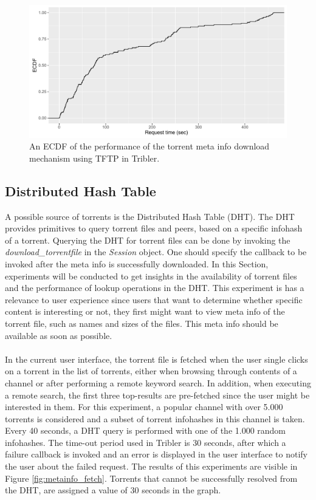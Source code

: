 \begin{figure}[!h]
	\centering
	\includegraphics[width=0.9\columnwidth]{images/experiments/tftp_performance}
	\caption{An ECDF of the performance of the torrent meta info download mechanism using TFTP in Tribler.}
	\label{fig:tftp_performance}
\end{figure}

\subsection{Distributed Hash Table}
A possible source of torrents is the Distributed Hash Table (DHT). The DHT provides primitives to query torrent files and peers, based on a specific infohash of a torrent. Querying the DHT for torrent files can be done by invoking the \emph{download\_torrentfile} in the \emph{Session} object. One should specify the callback to be invoked after the meta info is successfully downloaded. In this Section, experiments will be conducted to get insights in the availability of torrent files and the performance of lookup operations in the DHT. This experiment is has a relevance to user experience since users that want to determine whether specific content is interesting or not, they first might want to view meta info of the torrent file, such as names and sizes of the files. This meta info should be available as soon as possible.\\\\
In the current user interface, the torrent file is fetched when the user single clicks on a torrent in the list of torrents, either when browsing through contents of a channel or after performing a remote keyword search. In addition, when executing a remote search, the first three top-results are pre-fetched since the user might be interested in them. For this experiment, a popular channel with over 5.000 torrents is considered and a subset of torrent infohashes in this channel is taken. Every 40 seconds, a DHT query is performed with one of the 1.000 random infohashes. The time-out period used in Tribler is 30 seconds, after which a failure callback is invoked and an error is displayed in the user interface to notify the user about the failed request. The results of this experiments are visible in Figure \ref{fig:metainfo_fetch}. Torrents that cannot be successfully resolved from the DHT, are assigned a value of 30 seconds in the graph.\\

